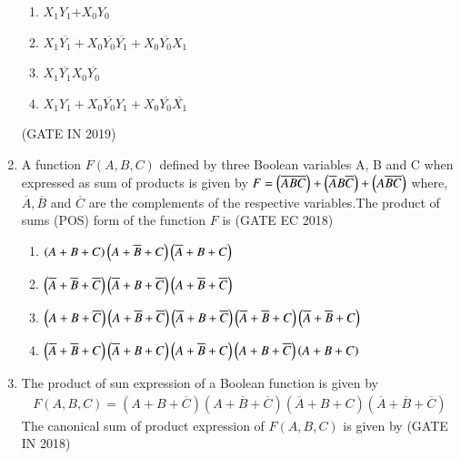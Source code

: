 \begin{enumerate}[label=\arabic*.,ref=\theenumi]
\begin{enumerate}
                        \item$X_1Y_1$+$X_0Y_0$
                        \item$X_1\overline{Y_1}+X_0\overline{Y_0}\overline{Y_1}+X_0\overline{Y_0}X_1$
                        \item$X_1\overline{Y_1}X_0\overline{Y_0}$
                        \item$X_1Y_1+X_0\overline{Y_0}Y_1+X_0\overline{Y_0}\overline{X_1}$
                  \end{enumerate}
            \hfill(GATE IN 2019)
%
\item
	\label{prob:2023-gate-ec-9}
	A function $F(A, B, C)$ defined by three Boolean variables A, B and C when expressed as sum of products is given by \newline$ F = \left(\overline{A}  \overline{B}  \overline{C}\right) + \left(\overline{A}  B  \overline{C}\right) + \left(A  \overline{B}  \overline{C}\right) $
where, $\overline{A},\overline{B}$ and $\overline{C}$ are the complements of the respective variables.The product of sums (POS) form of the function $F$ is
\hfill(GATE EC 2018)
%
\begin{enumerate}
	\item $ \left(A+B+C\right)  \left(A+\overline{B}+C\right)  \left(\overline{A}+B+C\right) $
 	\item $ \left(\overline{A}+\overline{B}+\overline{C}\right)  \left(\overline{A}+B+\overline{C}\right)  \left(A+\overline{B}+\overline{C}\right) $
	\item $ \left(A+B+\overline{C}\right)  \left(A+\overline{B}+\overline{C}\right)  \left(\overline{A}+B+\overline{C}\right)  \left(\overline{A}+\overline{B}+C\right)  \left(\overline{A}+\overline{B}+C\right) $
	\item $ \left(\overline{A}+\overline{B}+C\right)  \left(\overline{A}+B+C\right)  \left(A+\overline{B}+C\right)  \left(A+B+\overline{C}\right)  \left(A+B+C\right) $
\end{enumerate}
\item
\label{prob:gate IN 43}
The product of sun expression of a Boolean function
                is given by 
                \begin{align}
			F(A,B,C)=(A+B+\overline{C})(A+\overline{B}+\overline{C})
			(\overline{A}+B+C)(\overline{A}+\overline{B}+\overline{C})
                \end{align}
                The canonical sum of product expression of $F(A,B,C)$ is given by 
		\hfill(GATE IN 2018)
                 \begin{enumerate}
 

\end{enumerate}
\end{enumerate}
